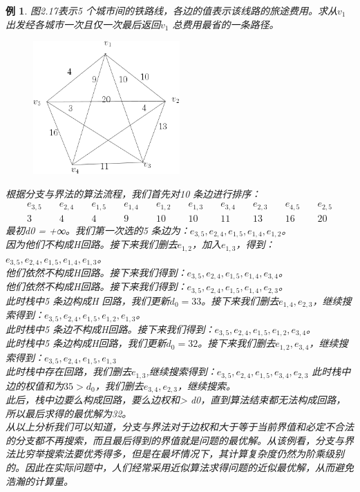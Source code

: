 \documentclass[11pt,a4paper,openany]{book}
\newtheorem{sample}{\textbf{例}}[section]
\begin{document}
\begin{sample}
图2.17表示5 个城市间的铁路线，各边的值表示该线路的旅途费用。求从$v_1$出发经各城市一次且仅一次最后返回$v_1$ 总费用最省的一条路径。\\
\begin{figure}[H]
  \centering
  \includegraphics[width=0.5\textwidth]{2.17.png}
  \caption{}
\end{figure}
\noindent 根据分支与界法的算法流程，我们首先对10 条边进行排序：\\
\begin{align*}
  e_{3,5} & \quad e_{2,4}& \quad e_{1,5}&\quad e_{1,4}&\quad e_{1,2}&\quad e_{1,3}&\quad e_{3,4}&\quad e_{2,3}&\quad e_{4,5}&\quad e_{2,5}\\
  3 & \quad 4& \quad 4& \quad 9& \quad 10& \quad 10& \quad 11& \quad 13& \quad 16& \quad 20
\end{align*}
\indent 最初d0 = +∞。我们第一次选的5 条边为：$e_{3,5},e_{2,4},e_{1,5},e_{1,4},e_{1,2}$。\\
\indent 因为他们不构成H回路。接下来我们删去$e_{1,2}$，加入$e_{1,3}$，得到：$e_{3,5},e_{2,4},e_{1,5},e_{1,4},e_{1,3}$。\\
\indent 他们依然不构成H回路。接下来我们得到：$e_{3,5},e_{2,4},e_{1,5},e_{1,4},e_{3,4}$。\\
\indent 他们依然不构成H回路。接下来我们得到：$e_{3,5},e_{2,4},e_{1,5},e_{1,4},e_{2,3}$。\\
\indent 此时栈中5 条边构成H 回路，我们更新$d_0 = 33$。接下来我们删去$e_{1,4},e_{2,3}$，继续搜索得到：$e_{3,5},e_{2,4},e_{1,5},e_{1,2},e_{1,3}$。\\
\indent 此时栈中5 条边不构成H回路。接下来我们得到：$e_{3,5},e_{2,4},e_{1,5},e_{1,2},e_{3,4}$。\\
\indent 此时栈中5 条边构成H回路，我们更新$d_0 = 32$。接下来我们删去$e_{1,2},e_{3,4}$，继续搜索得到：$e_{3,5},e_{2,4},e_{1,5},e_{1,3}$\\
\indent 此时栈中存在回路，我们删去$e_{1,3}$,继续搜索得到：$e_{3,5},e_{2,4},e_{1,5},e_{3,4},e_{2,3}$ 此时栈中边的权值和为$35>d_0$，我们删去$e_{3,4},e_{2,3}$，继续搜索。\\
\indent 此后，栈中边要么构成回路，要么边权和> d0，直到算法结束都无法构成回路，所以最后求得的最优解为32。\\
\indent 从以上分析我们可以知道，分支与界法对于边权和大于等于当前界值和必定不合法的分支都不再搜索，而且最后得到的界值就是问题的最优解。从该例看，分支与界法比穷举搜索法要优秀得多，但是在最坏情况下，其计算复杂度仍然为阶乘级别的。因此在实际问题中，人们经常采用近似算法求得问题的近似最优解，从而避免浩瀚的计算量。\\
\end{sample}
\end{document}
